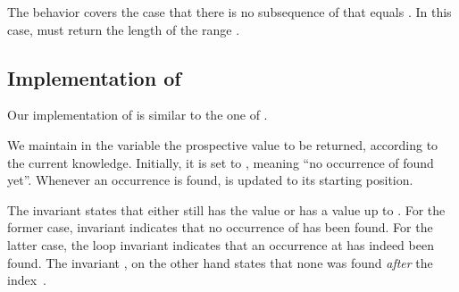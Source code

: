 The behavior  covers the case that there is no
subsequence of  that equals
. In this case, \findend must return the length  of the
range .



\clearpage

\subsection{Implementation of \findend}

Our implementation of  is similar to the one of .



We maintain in the variable  the prospective value to be
returned, according to the current knowledge.
Initially, it is set to , meaning ``no occurrence of 
found yet''.
Whenever an occurrence is found,  is updated to its starting
position.

The invariant  states that  either still has the value
 or has a value up to .
For the former case, invariant 
indicates that no occurrence of  has been found.
For the latter case, the loop invariant  indicates that an occurrence
 at  has indeed been found.
The invariant , on the other hand states that
none was found \emph{after} the index~.

\clearpage

